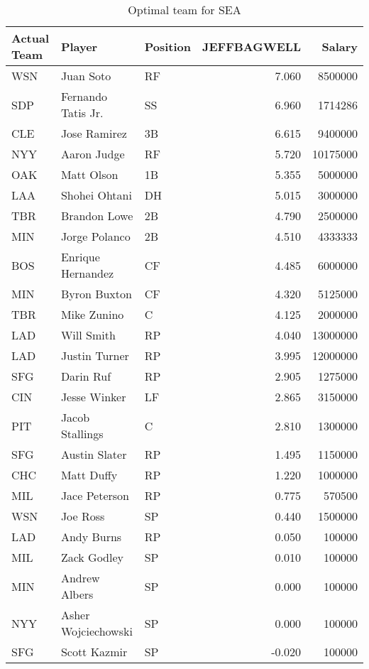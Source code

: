 \begin{table}

\caption{Optimal team for SEA}
\centering
\begin{tabular}[t]{l|l|l|r|r}
\hline
Actual Team & Player & Position & JEFFBAGWELL & Salary\\
\hline
WSN & Juan Soto & RF & 7.060 & 8500000\\
\hline
SDP & Fernando Tatis Jr. & SS & 6.960 & 1714286\\
\hline
CLE & Jose Ramirez & 3B & 6.615 & 9400000\\
\hline
NYY & Aaron Judge & RF & 5.720 & 10175000\\
\hline
OAK & Matt Olson & 1B & 5.355 & 5000000\\
\hline
LAA & Shohei Ohtani & DH & 5.015 & 3000000\\
\hline
TBR & Brandon Lowe & 2B & 4.790 & 2500000\\
\hline
MIN & Jorge Polanco & 2B & 4.510 & 4333333\\
\hline
BOS & Enrique Hernandez & CF & 4.485 & 6000000\\
\hline
MIN & Byron Buxton & CF & 4.320 & 5125000\\
\hline
TBR & Mike Zunino & C & 4.125 & 2000000\\
\hline
LAD & Will Smith & RP & 4.040 & 13000000\\
\hline
LAD & Justin Turner & RP & 3.995 & 12000000\\
\hline
SFG & Darin Ruf & RP & 2.905 & 1275000\\
\hline
CIN & Jesse Winker & LF & 2.865 & 3150000\\
\hline
PIT & Jacob Stallings & C & 2.810 & 1300000\\
\hline
SFG & Austin Slater & RP & 1.495 & 1150000\\
\hline
CHC & Matt Duffy & RP & 1.220 & 1000000\\
\hline
MIL & Jace Peterson & RP & 0.775 & 570500\\
\hline
WSN & Joe Ross & SP & 0.440 & 1500000\\
\hline
LAD & Andy Burns & RP & 0.050 & 100000\\
\hline
MIL & Zack Godley & SP & 0.010 & 100000\\
\hline
MIN & Andrew Albers & SP & 0.000 & 100000\\
\hline
NYY & Asher Wojciechowski & SP & 0.000 & 100000\\
\hline
SFG & Scott Kazmir & SP & -0.020 & 100000\\
\hline
\end{tabular}
\end{table}
